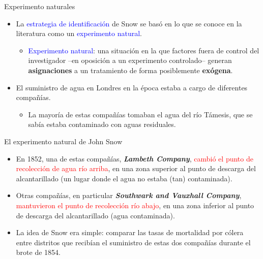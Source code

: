 \documentclass[10pt, xcolor=dvipsnames]{beamer}
\begin{document}
\begin{frame}{Experimento naturales}
\begin{itemize}\setlength{\itemsep}{1.0em}
	\item La \textcolor{blue}{estrategia de identificación} de Snow se basó en lo que se conoce en la literatura como un \textcolor{blue}{experimento natural}. \smallspace
	\begin{itemize}
    	\item \textcolor{blue}{Experimento natural}: una situación en la que factores fuera de control del investigador --en oposición a un experimento controlado-- generan \textbf{asignaciones} a un tratamiento de forma posiblemente \textbf{exógena}.
    \end{itemize}
	\item El suministro de agua en Londres en la época estaba a cargo de diferentes compañías. \smallspace
    \begin{itemize}
        \item La mayoría de estas compañías tomaban el agua del río Támesis, que se sabía estaba contaminado con aguas residuales. 
    \end{itemize}
\end{itemize}	     
\end{frame}


\begin{frame}{El experimento natural de John Snow}
	\begin{itemize}\setlength{\itemsep}{1.0em}
		\item En 1852, una de estas compañías, \textbf{\textit{Lambeth Company}}, \textcolor{red}{cambió el punto de recolección de agua río arriba}, en una zona superior al punto de descarga del alcantarillado (un lugar donde el agua no estaba (tan) contaminada).
		\item Otras compañías, en particular \textbf{\textit{Southwark and Vauxhall Company}}, \textcolor{red}{mantuvieron el punto de recolección río abajo}, en una zona inferior al punto de descarga del alcantarillado (agua contaminada). \smallspace
		\item La idea de Snow era simple: comparar las tasas de mortalidad por cólera entre distritos que recibían el suministro de estas dos compañías durante el brote de 1854. 
	\end{itemize}	     
\end{frame}
\end{document}
